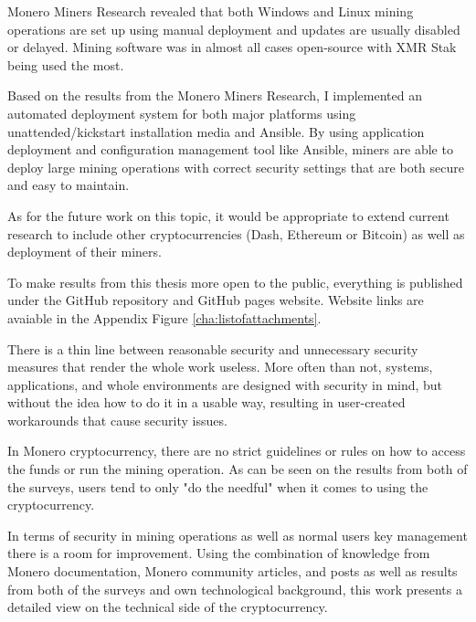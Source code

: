 \documentclass[
  printed, %
  table,   %
  lof,     %
  lot,     %
           oneside, color
]{fithesis3}
\begin{document}
Monero Miners Research revealed that both Windows and Linux mining operations are set up using manual deployment and updates are usually disabled or delayed. Mining software was in almost all cases open-source with XMR Stak being used the most. 

Based on the results from the Monero Miners Research, I implemented an automated deployment system for both major platforms using unattended/kickstart installation media and Ansible. By using application deployment and configuration management tool like Ansible, miners are able to deploy large mining operations with correct security settings that are both secure and easy to maintain. 

As for the future work on this topic, it would be appropriate to extend current research to include other cryptocurrencies (Dash, Ethereum or Bitcoin) as well as deployment of their miners. 

To make results from this thesis more open to the public, everything is published under the GitHub repository and GitHub pages website. Website links are avaiable in the Appendix Figure \ref{cha:listofattachments}.





\iffalse There is a thin line between reasonable security and unnecessary security measures that render the whole work useless. More often than not, systems, applications, and whole environments are designed with security in mind, but without the idea how to do it in a usable way, resulting in user-created workarounds that cause security issues.

In Monero cryptocurrency, there are no strict guidelines or rules on how to access the funds or run the mining operation. As can be seen on the results from both of the surveys, users tend to only "do the needful" when it comes to using the cryptocurrency.


In terms of security in mining operations as well as normal users key management there is a room for improvement. Using the combination of knowledge from  Monero documentation, Monero community articles, and posts as well as results from both of the surveys and own technological background, this work presents a detailed view on the technical side of the cryptocurrency.
\end{document}
